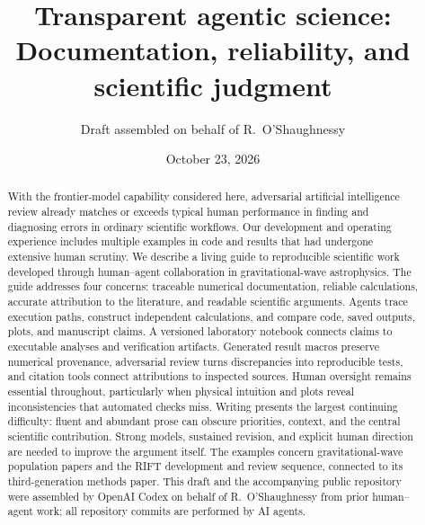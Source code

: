 \documentclass[aps,prd,reprint,nofootinbib]{revtex4-2}
\begin{document}
\title{Transparent agentic science: Documentation, reliability, and scientific judgment}
\author{Draft assembled on behalf of R.~O'Shaughnessy}
\noaffiliation
\date{October 23, 2026}
\begin{abstract}
With the frontier-model capability considered here, adversarial artificial intelligence review already matches or exceeds typical human performance in finding and diagnosing errors in ordinary scientific workflows. Our development and operating experience includes multiple examples in code and results that had undergone extensive human scrutiny. We describe a living guide to reproducible scientific work developed through human--agent collaboration in gravitational-wave astrophysics. The guide addresses four concerns: traceable numerical documentation, reliable calculations, accurate attribution to the literature, and readable scientific arguments. Agents trace execution paths, construct independent calculations, and compare code, saved outputs, plots, and manuscript claims. A versioned laboratory notebook connects claims to executable analyses and verification artifacts. Generated result macros preserve numerical provenance, adversarial review turns discrepancies into reproducible tests, and citation tools connect attributions to inspected sources. Human oversight remains essential throughout, particularly when physical intuition and plots reveal inconsistencies that automated checks miss. Writing presents the largest continuing difficulty: fluent and abundant prose can obscure priorities, context, and the central scientific contribution. Strong models, sustained revision, and explicit human direction are needed to improve the argument itself. The examples concern gravitational-wave population papers and the RIFT development and review sequence, connected to its third-generation methods paper. This draft and the accompanying public repository were assembled by OpenAI Codex on behalf of R.~O'Shaughnessy from prior human--agent work; all repository commits are performed by AI agents.
\end{abstract}
\maketitle
\end{document}
